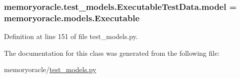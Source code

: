 \subsubsection[{model}]{\setlength{\rightskip}{0pt plus 5cm}memoryoracle.\+test\+\_\+models.\+Executable\+Test\+Data.\+model = {\bf memoryoracle.\+models.\+Executable}\hspace{0.3cm}{\ttfamily [static]}}\label{classmemoryoracle_1_1test__models_1_1ExecutableTestData_a81ed1592e6042c61fe80728b55275bdc}


Definition at line 151 of file test\+\_\+models.\+py.



The documentation for this class was generated from the following file\+:\begin{DoxyCompactItemize}
\item 
memoryoracle/\hyperlink{test__models_8py}{test\+\_\+models.\+py}\end{DoxyCompactItemize}
